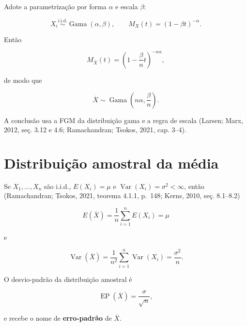 \documentclass[
  letterpaper,
  DIV=11,
  numbers=noendperiod]{scrreprt}
\begin{document}
\begin{tcolorbox}[enhanced jigsaw, colback=white, leftrule=.75mm, colbacktitle=quarto-callout-tip-color!10!white, breakable, titlerule=0mm, bottomtitle=1mm, title=\textcolor{quarto-callout-tip-color}{\faLightbulb}\hspace{0.5em}{Exemplo --- Média de variáveis gama}, colframe=quarto-callout-tip-color-frame, toprule=.15mm, opacityback=0, bottomrule=.15mm, opacitybacktitle=0.6, arc=.35mm, toptitle=1mm, rightrule=.15mm, coltitle=black, left=2mm]

Adote a parametrização por forma \(\alpha\) e escala \(\beta\):

\[X_i\overset{\mathrm{i.i.d.}}{\sim}\operatorname{Gama}(\alpha,\beta),
\qquad
M_X(t)=(1-\beta t)^{-\alpha}.\]

Então

\[M_{\overline{X}}(t)
=
\left(1-\frac{\beta}{n}t\right)^{-n\alpha},\]

de modo que

\[\overline{X}\sim\operatorname{Gama}\left(n\alpha,\frac{\beta}{n}\right).\]

A conclusão usa a FGM da distribuição gama e a regra de escala (Larsen;
Marx, 2012, seç. 3.12 e 4.6; Ramachandran; Tsokos, 2021, cap. 3--4).

\end{tcolorbox}

\section{Distribuição amostral da
média}\label{distribuiuxe7uxe3o-amostral-da-muxe9dia}

Se \(X_1,\ldots,X_n\) são i.i.d., \(E(X_i)=\mu\) e
\(\operatorname{Var}(X_i)=\sigma^2<\infty\), então (Ramachandran;
Tsokos, 2021, teorema 4.1.1, p.~148; Kerns, 2010, seç. 8.1--8.2)

\[E(\overline{X})
=
\frac{1}{n}\sum_{i=1}^nE(X_i)
=
\mu\]

e

\[\operatorname{Var}(\overline{X})
=
\frac{1}{n^2}\sum_{i=1}^n\operatorname{Var}(X_i)
=
\frac{\sigma^2}{n}.\]

O desvio-padrão da distribuição amostral é

\[\operatorname{EP}(\overline{X})
=
\frac{\sigma}{\sqrt{n}},\]

e recebe o nome de \textbf{erro-padrão} de \(\overline{X}\).
\end{document}
